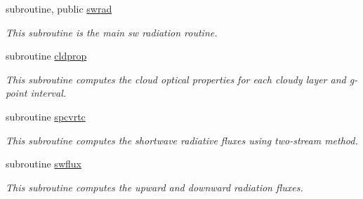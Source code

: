 {\bf }\par
\begin{DoxyCompactItemize}
\item 
subroutine, public \hyperlink{group__module__radsw__main_ga1186b2e2f7ebd5fb6dfbb43222d3ab3c}{swrad}
\begin{DoxyCompactList}\small\item\em This subroutine is the main sw radiation routine. \end{DoxyCompactList}\end{DoxyCompactItemize}

{\bf }\par
\begin{DoxyCompactItemize}
\item 
subroutine \hyperlink{group__module__radsw__main_ga1a3bb4385e7a610aa7eec9759383ffe9}{cldprop}
\begin{DoxyCompactList}\small\item\em This subroutine computes the cloud optical properties for each cloudy layer and g-\/point interval. \end{DoxyCompactList}\end{DoxyCompactItemize}

{\bf }\par
\begin{DoxyCompactItemize}
\item 
subroutine \hyperlink{group__module__radsw__main_gaed15bfde1b9f2286c58f6c807f8bf479}{spcvrtc}
\begin{DoxyCompactList}\small\item\em This subroutine computes the shortwave radiative fluxes using two-\/stream method. \end{DoxyCompactList}\end{DoxyCompactItemize}

{\bf }\par
\begin{DoxyCompactItemize}
\item 
subroutine \hyperlink{group__module__radsw__main_ga53ae1cb0229a048545027667adcc3cd7}{swflux}
\begin{DoxyCompactList}\small\item\em This subroutine computes the upward and downward radiation fluxes. \end{DoxyCompactList}\end{DoxyCompactItemize}

